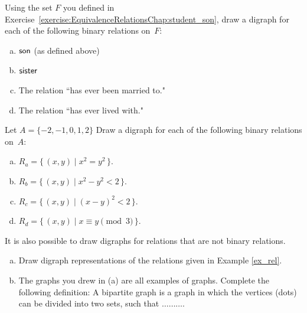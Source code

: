  \begin{exer} \label{DrawBinRelExer}
Using the set $F$ you defined in Exercise~\ref{exercise:EquivalenceRelationsChap:student_son}, draw a digraph for each of the following binary relations on~$F$: 
 \begin{enumerate}[(a)]
 \item \label{DrawBinRelExer-son}
 $\sf{son}$  (as defined above) 
 \item \label{DrawBinRelExer-sister}
 $\sf{sister}$
 \item \label{DrawBinRelExer-married}
 The relation ``has ever been married to."
  \item \label{DrawBinRelExer-lived}
 The relation ``has ever lived with."
 \end{enumerate}
 \end{exer}
 
 \begin{exer} \label{DrawBinRelExer}
Let $A =  \{-2,-1,0,1,2\}$ Draw a digraph for each of the following binary relations on~$A$: 

 \begin{enumerate}[(a)]
 \item \label{DrawBinRelExer-son}
 $R_a = \{\, (x,y) \mid  x^2 = y^2 \,\} .$
 \item \label{DrawBinRelExer-sister}
$ R_b = \{\, (x,y) \mid  x^2 - y^2 < 2 \,\} .$
 \item \label{DrawBinRelExer-married}
 $ R_c = \{\, (x,y) \mid  (x-y)^2 < 2 \,\} .$
  \item \label{DrawBinRelExer-lived}
$ R_d = \{\, (x,y) \mid  x\equiv y \pmod{3} \,\} .$
 \end{enumerate}
 \end{exer}

 \begin{exer} \label{DrawBinRelExer2}
It is also possible to draw digraphs for relations that are not binary relations.  
 \begin{enumerate}[(a)]
 \item \label{DrawBinRelExer-son}
Draw digraph representations of the relations given in Example \ref{ex_rel}.
 \item \label{DrawBinRelExer-sister}
The graphs you drew in (a) are all examples of  graphs.  Complete the following definition:  A bipartite graph is a graph in which the vertices (dots) can be divided into two  sets, such that $\ldots \ldots \ldots$.
 \end{enumerate}
 \end{exer}


